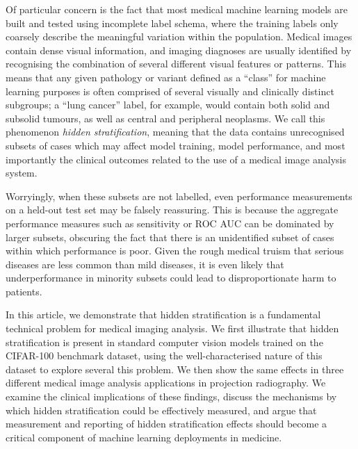 \documentclass{article}
\begin{document}
Of particular concern is the fact that most medical machine learning models are built and tested using incomplete label schema, where the training labels only coarsely describe the meaningful variation within the population. 
Medical images contain dense visual information, and imaging diagnoses are usually identified by recognising the combination of several different visual features or patterns. 
This means that any given pathology or variant defined as a ``class'' for machine learning purposes is often comprised of several visually and clinically distinct subgroups; a ``lung cancer'' label, for example, would contain both solid and subsolid tumours, as well as central and peripheral neoplasms. 
We call this phenomenon \textit{hidden stratification}, meaning that the data contains unrecognised subsets of cases which may affect model training, model performance, and most importantly the clinical outcomes related to the use of a medical image analysis system.  

Worryingly, when these subsets are not labelled, even performance measurements on a held-out test set may be falsely reassuring. 
This is because the aggregate performance measures such as sensitivity or ROC AUC can be dominated by larger subsets, obscuring the fact that there is an unidentified subset of cases within which performance is poor. 
Given the rough medical truism that serious diseases are less common than mild diseases, it is even likely that underperformance in minority subsets could lead to disproportionate harm to patients.

In this article, we demonstrate that hidden stratification is a fundamental technical problem for medical imaging analysis. 
We first illustrate that hidden stratification is present in standard computer vision models trained on the CIFAR-100 benchmark dataset, using the well-characterised nature of this dataset to explore several this problem. We then show the same effects in three different medical image analysis applications in projection radiography. 
We examine the clinical implications of these findings, discuss the mechanisms by which hidden stratification could be effectively measured, and argue that measurement and reporting of hidden stratification effects should become a critical component of machine learning deployments in medicine.

\end{document}

